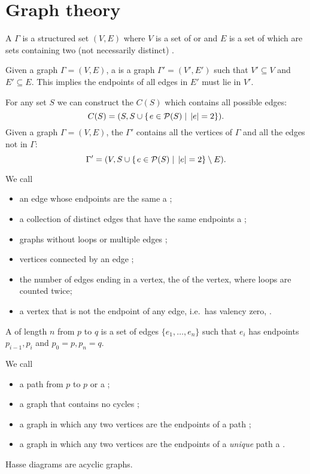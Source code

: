\chapter{Graph theory}

\begin{definition}
A  $\Gamma$ is a structured set $(V,E)$ where $V$ is a set of  or  and $E$ is a set of  which are sets containing two (not necessarily distinct) .

Given a graph $\Gamma = (V,E)$, a  is a graph $\Gamma' = (V', E')$ such that $V'\subseteq V$ and $E'\subseteq E$. This implies the endpoints of all edges in $E'$ must lie in $V'$.

For any set $S$ we can construct the  $C(S)$ which contains all possible edges:
\[C(S) = (S, S\cup\left\{\left. e\in\mathcal{P}(S) \;\right|\; |e|=2 \right\}).\]
Given a graph $\Gamma = (V,E)$, the  $\Gamma'$ contains all the vertices of $\Gamma$ and all the edges not in $\Gamma$:
\[ \Gamma' = (V, S\cup\left\{\left. e\in\mathcal{P}(S) \;\right|\; |e|=2 \right\} \setminus E). \]

We call
\begin{itemize}
\item an edge whose endpoints are the same a ;
\item a collection of distinct edges that have the same endpoints a ;
\item graphs without loops or multiple edges ;
\item vertices connected by an edge ;
\item the number of edges ending in a vertex, the  of the vertex, where loops are counted twice;
\item a vertex that is not the endpoint of any edge, i.e.\ has valency zero, .
\end{itemize}

A  of length $n$ from  $p$ to $q$ is a set of edges $\{e_1, \ldots, e_n\}$ such that $e_i$ has endpoints $p_{i-1}, p_i$ and $p_0 =p, p_n = q$.

We call
\begin{itemize}
\item a path from $p$ to $p$  or a ;
\item a graph that contains no cycles ;
\item a graph in which any two vertices are the endpoints of a path ;
\item a graph in which any two vertices are the endpoints of a \emph{unique} path a .
\end{itemize}
\end{definition}
\begin{example}
Hasse diagrams are acyclic graphs.
\end{example}

